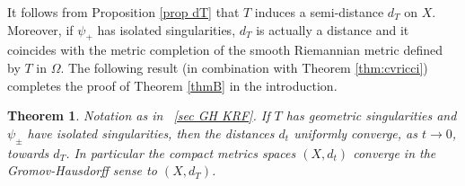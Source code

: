 \documentclass[a4paper,11pt,leqno,english]{smfart}
\theoremstyle{plain}
\newtheorem{thm}{Theorem}[section]
\theoremstyle{plain}
\numberwithin{equation}{section} %
\numberwithin{figure}{section} %
\theoremstyle{plain}
\theoremstyle{plain}
\theoremstyle{remark}
\theoremstyle{remark}
\theoremstyle{definition}
\theoremstyle{plain}
\theoremstyle{plain}
\theoremstyle{definition}
\newcommand{\p}{\psi}
\begin{document}
It follows from Proposition \ref{prop dT} that $T$ induces a semi-distance $d_T$ on $X$. Moreover, if $\psi_+$ has isolated singularities, $d_T$ is actually a distance and it coincides with the metric completion of the smooth Riemannian metric defined by $T$ in $\Omega$.
The following result (in combination with Theorem \ref{thm:cvricci}) completes the proof of Theorem \ref{thmB} in the introduction.

\begin{thm} \label{thm:cvGHisolated}
Notation as in \textsection~\ref{sec GH KRF}. If $T$ has  geometric singularities and $\p_{\pm}$ have isolated singularities,
then 
the distances $d_{t}$ uniformly converge, as $t \rightarrow 0$, towards $d_{T}$.
In particular the compact metrics spaces $(X,d_{t})$ converge in the Gromov-Hausdorff sense
to  $(X,d_{T})$.
\end{thm}
\end{document}

